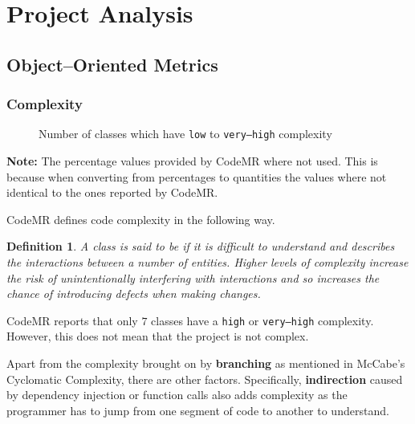 \documentclass[12pt]{article}
\newcommand{\note}[1]{\textbf{Note:} #1}
\DeclareRobustCommand{\ul}[1]{%
	\uline{\phantom{#1}}%
	\llap{\contour{white}{#1}}%
}
\newtheorem*{definition}{Definition}
\begin{document}
\section{Project Analysis}

\subsection{Object--Oriented Metrics}

\subsubsection{Complexity}

\begin{figure}[H]
    \centering
    \caption{Number of classes which have \texttt{low} to
    \texttt{very--high} complexity}
\end{figure}

\note{The percentage values provided by CodeMR where not used.
This is because when converting from percentages to quantities
the values where not identical to the ones reported by CodeMR.}

CodeMR defines code complexity in the following way.

\begin{definition}
    A class is said to be \ul{complex} if it is difficult to
    understand and describes the interactions between a number
    of entities. Higher levels of complexity increase the risk
    of unintentionally interfering with interactions and so
    increases the chance of introducing defects when making
    changes.
\end{definition}

CodeMR reports that only $7$ classes have a \texttt{high} or
\texttt{very--high} complexity. However, this does not mean that
the project is not complex.

Apart from the complexity brought on by \textbf{branching} as
mentioned in McCabe's Cyclomatic Complexity, there are other
factors. Specifically, \textbf{indirection} caused by dependency
injection or function calls also adds complexity as the
programmer has to jump from one segment of code to another to
understand.
\end{document}
